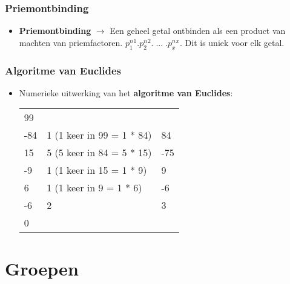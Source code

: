 \documentclass[12pt]{report}
\newcommand{\important}[1] {\textbf{\color{red}#1}}
\begin{document}
\subsection{Priemontbinding}
\begin{itemize}
 \item \important{Priemontbinding} $\rightarrow$ Een geheel getal ontbinden als een product van machten van priemfactoren.
 $p_1^n^1 . p_2^n^2 .\;...\;. p_x^n^x $. Dit is uniek voor elk getal.
\end{itemize}



\subsection{Algoritme van Euclides}
\begin{itemize}
 \item Numerieke uitwerking van het \important{algoritme van Euclides}: \newline

  \begin{tabular}{l l l}
  99 &  &  \\
  -84 & 1 (1 keer in 99 = 1 * 84) & 84 \\
  15 & 5  (5 keer in 84 = 5 * 15) & -75 \\
  -9 & 1  (1 keer in 15 = 1 * 9)& 9 \\
  6 & 1   (1 keer in 9 = 1 * 6)& -6 \\
  -6 & 2 & 3 \\
  0 & & 
 \end{tabular}


\end{itemize}



\chapter{Groepen}
\label{ch:groepen}
\end{document}
